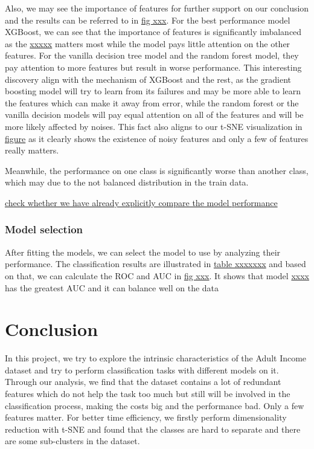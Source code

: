 \documentclass{article}
\begin{document}


Also, we may see the importance of features for further support on our conclusion and the results can be referred to in \underline{fig xxx}. For the best performance model XGBoost, we can see that the importance of features is significantly imbalanced as the \underline{xxxxx} matters most while the model pays little attention on the other features. For the vanilla decision tree model and the random forest model, they pay attention to more features but result in worse performance. This
interesting discovery align with the mechanism of XGBoost and the rest, as the gradient boosting model will try to learn from its failures and may be more able to learn the features which can make it away from error, while the random forest or the vanilla decision models will pay equal attention on all of the features and will be more likely affected by noises. This fact also aligns to our t-SNE visualization in \underline{figure} as it clearly shows the existence of noisy features and
only a few of features really matters.

Meanwhile, the performance on one class is significantly worse than another class, which may due to the not balanced distribution in the train data.

\underline{check whether we have already explicitly compare the model performance}

\subsubsection*{Model selection}



After fitting the models, we can select the model to use by analyzing their performance. The classification results are illustrated in \underline{table xxxxxxx} and based on that, we can calculate the ROC and AUC in \underline{fig xxx}. It shows that model \underline{xxxx} has the greatest AUC and it can balance well on the data


\section{Conclusion}

In this project, we try to explore the intrinsic characteristics of the Adult Income dataset and try to perform classification tasks with different models on it. Through our analysis, we find that the dataset contains a lot of redundant features which do not help the task too much but still will be involved in the classification process, making the costs big and the performance bad. Only a few features matter. For better time efficiency, we firstly perform dimensionality reduction
with t-SNE and found that the classes are hard to separate and there are some sub-clusters in the dataset. 
\end{document}
